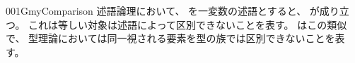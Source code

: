 \documentclass[index]{subfiles}
\begin{document}
\begin{myBlock}{001G}{myComparison}
  述語論理において、
  を一変数の述語とすると、
  が成り立つ。
  これは等しい対象は述語によって区別できないことを表す。
  はこの類似で、
  型理論においては同一視される要素を型の族では区別できないことを表す。
\end{myBlock}
\end{document}
